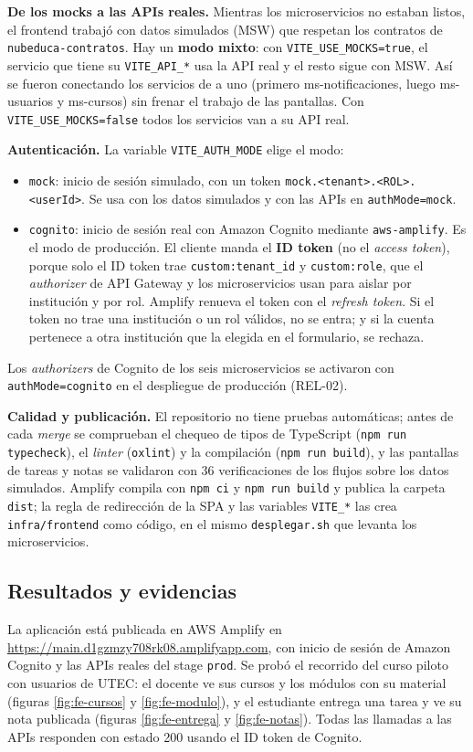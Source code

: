\textbf{De los mocks a las APIs reales.} Mientras los microservicios no estaban listos, el frontend
trabajó con datos simulados (MSW) que respetan los contratos de \texttt{nubeduca-contratos}. Hay un
\textbf{modo mixto}: con \texttt{VITE\_USE\_MOCKS=true}, el servicio que tiene su
\texttt{VITE\_API\_*} usa la API real y el resto sigue con MSW. Así se fueron conectando los servicios
de a uno (primero ms-notificaciones, luego ms-usuarios y ms-cursos) sin frenar el trabajo de las
pantallas. Con \texttt{VITE\_USE\_MOCKS=false} todos los servicios van a su API real.

\textbf{Autenticación.} La variable \texttt{VITE\_AUTH\_MODE} elige el modo:
\begin{itemize}
  \item \texttt{mock}: inicio de sesión simulado, con un token \texttt{mock.<tenant>.<ROL>.<userId>}. Se
        usa con los datos simulados y con las APIs en \texttt{authMode=mock}.
  \item \texttt{cognito}: inicio de sesión real con Amazon Cognito mediante \texttt{aws-amplify}. Es el
        modo de producción. El cliente manda el \textbf{ID token} (no el \textit{access token}),
        porque solo el ID token trae \texttt{custom:tenant\_id} y \texttt{custom:role}, que el
        \textit{authorizer} de API Gateway y los microservicios usan para aislar por institución y
        por rol. Amplify renueva el token con el \textit{refresh token}. Si el token no trae una
        institución o un rol válidos, no se entra; y si la cuenta pertenece a otra institución que la
        elegida en el formulario, se rechaza.
\end{itemize}
Los \textit{authorizers} de Cognito de los seis microservicios se activaron con \texttt{authMode=cognito}
en el despliegue de producción (REL-02).

\textbf{Calidad y publicación.} El repositorio no tiene pruebas automáticas; antes de cada \textit{merge}
se comprueban el chequeo de tipos de TypeScript (\texttt{npm run typecheck}), el \textit{linter}
(\texttt{oxlint}) y la compilación (\texttt{npm run build}), y las pantallas de tareas y notas se
validaron con 36 verificaciones de los flujos sobre los datos simulados. Amplify compila con
\texttt{npm ci} y \texttt{npm run build} y publica la carpeta \texttt{dist}; la regla de redirección de
la SPA y las variables \texttt{VITE\_*} las crea \texttt{infra/frontend} como código, en el mismo
\texttt{desplegar.sh} que levanta los microservicios.

\subsection{Resultados y evidencias}
La aplicación está publicada en AWS Amplify en \url{https://main.d1gzmzy708rk08.amplifyapp.com}, con
inicio de sesión de Amazon Cognito y las APIs reales del stage \texttt{prod}. Se probó el recorrido del
curso piloto con usuarios de UTEC: el docente ve sus cursos y los módulos con su material (figuras
\ref{fig:fe-cursos} y \ref{fig:fe-modulo}), y el estudiante entrega una tarea y ve su nota publicada
(figuras \ref{fig:fe-entrega} y \ref{fig:fe-notas}). Todas las llamadas a las APIs responden con
estado 200 usando el ID token de Cognito.

